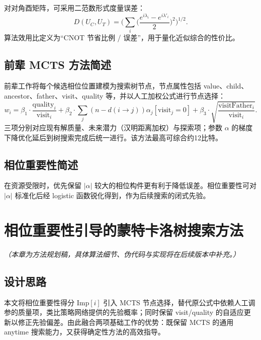 \documentclass{HDU-Bachelor-Thesis}
\begin{document}
对对角酉矩阵，可采用二范数形式度量误差：
\begin{equation}
  D(U_C,U_T)=\Biggl(\sum_i\Biggl(\frac{e^{i\lambda_i}-e^{i\lambda'_i}}{2}\Biggr)^{\!2}\Biggr)^{\!1/2}.
\end{equation}
算法效用比定义为“CNOT 节省比例 / 误差”，用于量化近似综合的性价比\cite{zhang2024approximate}。

\subsection{前辈 MCTS 方法简述}

前辈工作将每个候选相位位置建模为搜索树节点，节点属性包括 value、child、ancestor、father、visit、quality 等，并以人工加权公式进行节点选择\cite{nisq-mcts-thesis}：
\begin{equation}
  w_i=\beta_1\cdot\frac{\mathrm{quality}_i}{\mathrm{visit}_i}
  +\beta_2\cdot\sum_j(n-d(i\!\to\!j))\alpha_j[\mathrm{visit}_j=0]
  +\beta_3\cdot\sqrt{\frac{\mathrm{visitFather}_i}{\mathrm{visit}_i}}.
\end{equation}
三项分别对应现有解质量、未来潜力（汉明距离加权）与探索项；参数 $\alpha$ 的梯度下降优化延后到树搜索完成后统一进行。该方法最高可综合约12比特。

\subsection{相位重要性简述}

在资源受限时，优先保留 $|\alpha|$ 较大的相位构件更有利于降低误差。相位重要性可对 $|\alpha|$ 标准化后经 logistic 函数锐化得到\cite{zhang2024approximate}，作为后续搜索的闭式先验。

\clearpage
\section{相位重要性引导的蒙特卡洛树搜索方法}

\emph{（本章为方法规划稿，具体算法细节、伪代码与实现将在后续版本中补充。）}

\subsection{设计思路}

本文将相位重要性得分 $\mathrm{Imp}[i]$ 引入 MCTS 节点选择，替代原公式中依赖人工调参的质量项，类比策略网络提供的先验概率；同时保留 visit/quality 的自适应更新以修正先验偏差。由此融合两项基础工作的优势：既保留 MCTS 的通用 anytime 搜索能力，又获得确定性方法的高效指导。
\end{document}
